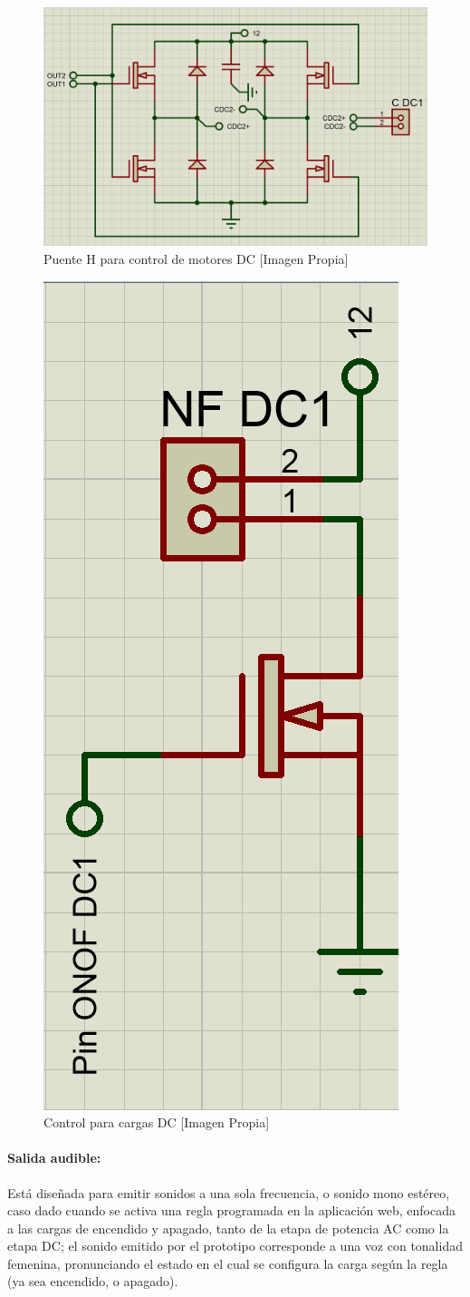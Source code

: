 		\begin{figure}[H]
			\centering
			\caption{Puente H para control de motores DC [Imagen Propia]}
			\label{fig:CDC}
			\includegraphics[width=0.7\linewidth]{Imagenes/CDC}
		\end{figure}
	
		\begin{figure}[H]
			\centering
			\caption{Control para cargas DC [Imagen Propia]}
			\label{fig:ONOFDC}
			\includegraphics[width=0.25\linewidth]{Imagenes/ONOFDC}
		\end{figure}
	
	\paragraph{Salida audible:}
		Está diseñada para emitir sonidos a una sola frecuencia, o sonido mono estéreo, caso dado cuando se activa una regla programada en la aplicación web, enfocada a las cargas de encendido y apagado, tanto de la etapa de potencia AC como la etapa DC; el sonido emitido por el prototipo corresponde a una voz con tonalidad femenina, pronunciando el estado en el cual se configura la carga según la regla (ya sea encendido, o apagado).\\
		
